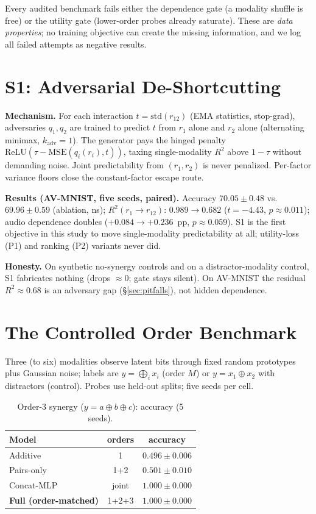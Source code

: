 \documentclass[10pt,twocolumn]{article}
\newcommand{\rIA}{r_{12}}
\newcommand{\ra}{r_1}
\newcommand{\rb}{r_2}
\begin{document}
Every audited benchmark fails either the dependence gate (a modality shuffle is free) or the
utility gate (lower-order probes already saturate). These are \emph{data properties}; no training
objective can create the missing information, and we log all failed attempts as negative results.

\section{S1: Adversarial De-Shortcutting}\label{sec:s1}
\textbf{Mechanism.} For each interaction $t=\mathrm{std}(\rIA)$ (EMA statistics, stop-grad),
adversaries $q_1, q_2$ are trained to predict $t$ from $\ra$ alone and $\rb$ alone (alternating
minimax, $k_{\mathrm{adv}}{=}1$). The generator pays the hinged penalty
$\mathrm{ReLU}(\tau-\mathrm{MSE}(q_i(r_i), t))$, taxing single-modality $R^2$ above $1{-}\tau$
without demanding noise. Joint predictability from $(\ra,\rb)$ is never penalized.
Per-factor variance floors close the constant-factor escape route.

\textbf{Results (AV-MNIST, five seeds, paired).} Accuracy $70.05{\pm}0.48$ vs.\ $69.96{\pm}0.59$
(ablation, ns); $R^2(\ra{\to}\rIA)$: $0.989\to0.682$ ($t=-4.43$, $p\approx0.011$); audio
dependence doubles ($+0.084\to+0.236$~pp, $p\approx0.059$). S1 is the first objective in this
study to move single-modality predictability at all; utility-loss (P1) and ranking (P2) variants
never did.

\textbf{Honesty.} On synthetic no-synergy controls and on a distractor-modality control, S1
fabricates nothing (drops $\approx0$; gate stays silent). On AV-MNIST the residual
$R^2\approx0.68$ is an adversary gap (\S\ref{sec:pitfalls}), not hidden dependence.

\section{The Controlled Order Benchmark}\label{sec:orderbench}
Three (to six) modalities observe latent bits through fixed random prototypes plus Gaussian noise;
labels are $y=\bigoplus_i x_i$ (order $M$) or $y=x_1{\oplus}x_2$ with distractors (control).
Probes use held-out splits; five seeds per cell.

\begin{table}[h]\centering\small
\caption{Order-3 synergy ($y{=}a{\oplus}b{\oplus}c$): accuracy (5 seeds).}
\begin{tabular}{lcc}
\toprule
Model & orders & accuracy \\
\midrule
Additive & 1 & $0.496\pm0.006$ \\
Pairs-only & 1+2 & $0.501\pm0.010$ \\
Concat-MLP & joint & $1.000\pm0.000$ \\
\textbf{Full (order-matched)} & 1+2+3 & $\mathbf{1.000\pm0.000}$ \\
\bottomrule
\end{tabular}
\end{table}
\end{document}
